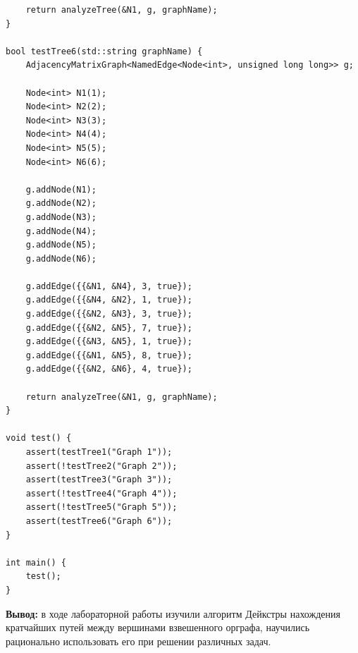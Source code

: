 \documentclass[a4paper,14pt]{extarticle}
\begin{document}
\begin{enumerate}[1.]
\begin{verbatim}
    return analyzeTree(&N1, g, graphName);
}

bool testTree6(std::string graphName) {
    AdjacencyMatrixGraph<NamedEdge<Node<int>, unsigned long long>> g;

    Node<int> N1(1);
    Node<int> N2(2);
    Node<int> N3(3);
    Node<int> N4(4);
    Node<int> N5(5);
    Node<int> N6(6);

    g.addNode(N1);
    g.addNode(N2);
    g.addNode(N3);
    g.addNode(N4);
    g.addNode(N5);
    g.addNode(N6);

    g.addEdge({{&N1, &N4}, 3, true});
    g.addEdge({{&N4, &N2}, 1, true});
    g.addEdge({{&N2, &N3}, 3, true});
    g.addEdge({{&N2, &N5}, 7, true});
    g.addEdge({{&N3, &N5}, 1, true});
    g.addEdge({{&N1, &N5}, 8, true});
    g.addEdge({{&N2, &N6}, 4, true});

    return analyzeTree(&N1, g, graphName);
}

void test() {
    assert(testTree1("Graph 1"));
    assert(!testTree2("Graph 2"));
    assert(testTree3("Graph 3"));
    assert(!testTree4("Graph 4"));
    assert(!testTree5("Graph 5"));
    assert(testTree6("Graph 6"));
}

int main() {
    test();
}
                    \end{verbatim}
                    
        \end{enumerate}

\textbf{Вывод: } в ходе лабораторной работы изучили алгоритм Дейкстры нахождения кратчайших путей между вершинами взвешенного орграфа,
научились рационально использовать его при решении различных задач.
\end{document}
